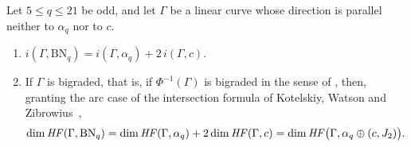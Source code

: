 \begin{theorem}\label{thm:pairing-full}
Let $5\le q\le21$ be odd, and let $\Gamma$ be a linear curve whose direction is parallel neither to
$\alpha_q$ nor to $c$.
\begin{enumerate}
\item[(a)] $i(\Gamma,\mathrm{BN}_q)=i(\Gamma,\alpha_q)+2\,i(\Gamma,c)$.
\item[(b)] If $\Gamma$ is bigraded, that is, if $\Phi^{-1}(\Gamma)$ is bigraded in the sense of \cite{KWZ},
 then, granting the arc case of the intersection formula of Kotelskiy, Watson and
 Zibrowius~\cite[Thm.~5.25]{KWZ},
 \[
  \dim\mathit{HF}(\Gamma,\mathrm{BN}_q)=\dim\mathit{HF}(\Gamma,\alpha_q)+2\dim\mathit{HF}(\Gamma,c)
  =\dim\mathit{HF}\bigl(\Gamma,\alpha_q\oplus(c,J_2)\bigr).
 \]
\end{enumerate}
\end{theorem}

